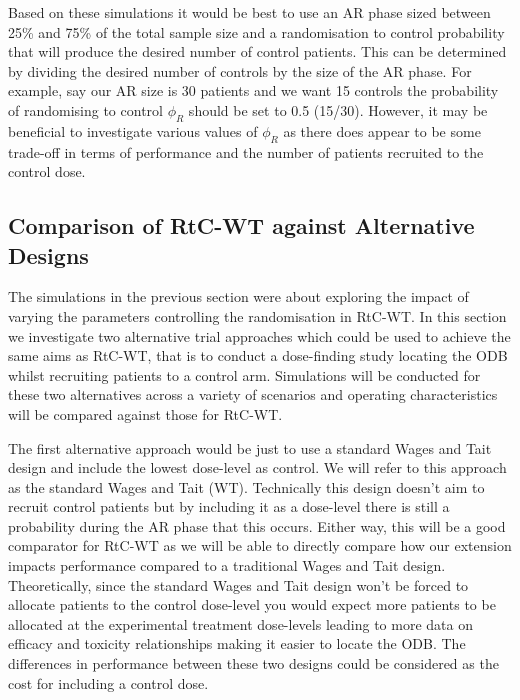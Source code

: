 Based on these simulations it would be best to use an AR phase sized between 25\% and 75\% of the total sample size and a randomisation to control probability that will produce the desired number of control patients. This can be determined by dividing the desired number of controls by the size of the AR phase. For example, say our AR size is 30 patients and we want 15 controls the probability of randomising to control $\phi_R$ should be set to 0.5 (15/30). However, it may be beneficial to investigate various values of $\phi_R$ as there does appear to be some trade-off in terms of performance and the number of patients recruited to the control dose.

\subsection{Comparison of RtC-WT against Alternative Designs }
\label{WT:CompAltDesigns}

The simulations in the previous section were about exploring the impact of varying the parameters controlling the randomisation in RtC-WT. In this section we investigate two alternative trial approaches which could be used to achieve the same aims as RtC-WT, that is to conduct a dose-finding study locating the ODB whilst recruiting patients to a control arm. Simulations will be conducted for these two alternatives across a variety of scenarios and operating characteristics will be compared against those for RtC-WT.       

The first alternative approach would be just to use a standard Wages and Tait design and include the lowest dose-level as control. We will refer to this approach as the standard Wages and Tait (WT). Technically this design doesn't aim to recruit control patients but by including it as a dose-level there is still a probability during the AR phase that this occurs. Either way, this will be a good comparator for RtC-WT as we will be able to directly compare how our extension impacts performance compared to a traditional Wages and Tait design. Theoretically, since the standard Wages and Tait design won't be forced to allocate patients to the control dose-level you would expect more patients to be allocated at the experimental treatment dose-levels leading to more data on efficacy and toxicity relationships making it easier to locate the ODB. The differences in performance between these two designs could be considered as the cost for including a control dose. 

